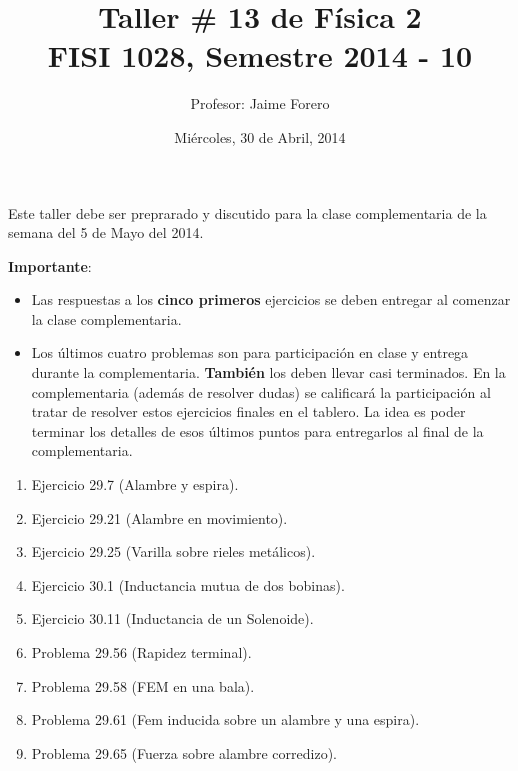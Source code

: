 \documentclass{article}
\title{Taller \# 13 de F\'isica 2\\ FISI 1028, Semestre 2014 - 10}
\author{Profesor: Jaime Forero}
\date{Mi\'ercoles, 30 de Abril, 2014}
\begin{document}
\maketitle
\thispagestyle{empty}

\noindent

Este taller debe ser preprarado y discutido para la clase
complementaria de la semana del 5 de Mayo del 2014. 

\noindent
{\bf Importante}:
\begin{itemize}

\item
Las respuestas a los {\bf cinco primeros} ejercicios se deben entregar
al comenzar la clase complementaria. 
\item 

Los \'ultimos cuatro problemas son para participaci\'on en clase y entrega
durante la complementaria. {\bf{Tambi\'en}} los deben llevar casi
terminados. En la complementaria (adem\'as de resolver dudas) se
calificar\'a la participaci\'on al tratar de resolver estos ejercicios
finales en el tablero. La idea es poder terminar los  detalles de esos
\'ultimos puntos para entregarlos al final de la complementaria.
\end{itemize}

\begin{enumerate}

\item
Ejercicio 29.7 (Alambre y espira).

\item
Ejercicio 29.21 (Alambre en movimiento).

\item
Ejercicio 29.25 (Varilla sobre rieles met\'alicos).

\item
Ejercicio 30.1 (Inductancia mutua de dos bobinas).

\item
Ejercicio 30.11 (Inductancia de un Solenoide).

\item
Problema 29.56 (Rapidez terminal).

\item
Problema 29.58 (FEM en una bala).

\item
Problema 29.61 (Fem inducida sobre un alambre y una espira).

\item
Problema 29.65 (Fuerza sobre alambre corredizo).


\end{enumerate}
\end{document}
